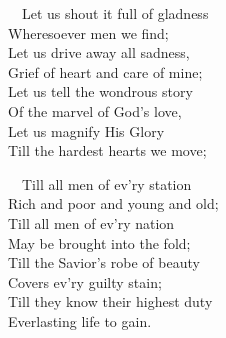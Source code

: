 \documentclass[
]{book}
\begin{document}
~~Let us shout it full of gladness\\
\hspace*{0.333em}\hspace*{0.333em}Wheresoever men we find;\\
\hspace*{0.333em}\hspace*{0.333em}Let us drive away all sadness,\\
\hspace*{0.333em}\hspace*{0.333em}Grief of heart and care of mine;\\
\hspace*{0.333em}\hspace*{0.333em}Let us tell the wondrous story\\
\hspace*{0.333em}\hspace*{0.333em}Of the marvel of God's love,\\
\hspace*{0.333em}\hspace*{0.333em}Let us magnify His Glory\\
\hspace*{0.333em}\hspace*{0.333em}Till the hardest hearts we move;

~~Till all men of ev'ry station\\
\hspace*{0.333em}\hspace*{0.333em}Rich and poor and young and old;\\
\hspace*{0.333em}\hspace*{0.333em}Till all men of ev'ry nation\\
\hspace*{0.333em}\hspace*{0.333em}May be brought into the fold;\\
\hspace*{0.333em}\hspace*{0.333em}Till the Savior's robe of beauty\\
\hspace*{0.333em}\hspace*{0.333em}Covers ev'ry guilty stain;\\
\hspace*{0.333em}\hspace*{0.333em}Till they know their highest duty\\
\hspace*{0.333em}\hspace*{0.333em}Everlasting life to gain.
\end{document}
